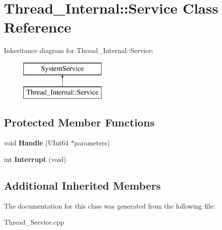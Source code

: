 \hypertarget{class_thread___internal_1_1_service}{}\section{Thread\+\_\+\+Internal\+:\+:Service Class Reference}
\label{class_thread___internal_1_1_service}
Inheritance diagram for Thread\+\_\+\+Internal\+:\+:Service\+:\begin{figure}[H]
\begin{center}
\leavevmode
\includegraphics[height=2.000000cm]{class_thread___internal_1_1_service}
\end{center}
\end{figure}
\subsection*{Protected Member Functions}
\begin{DoxyCompactItemize}
\item 
\mbox{\label{class_thread___internal_1_1_service_a7434ceb5b590d2d51acf5c562d6356bf}} 
void {\bfseries Handle} (U\+Int64 $\ast$parameters)
\item 
\mbox{\label{class_thread___internal_1_1_service_aef2458fd723cf27d8d0087311be26efc}} 
int {\bfseries Interrupt} (void)
\end{DoxyCompactItemize}
\subsection*{Additional Inherited Members}


The documentation for this class was generated from the following file\+:\begin{DoxyCompactItemize}
\item 
Thread\+\_\+\+Service.\+cpp\end{DoxyCompactItemize}
